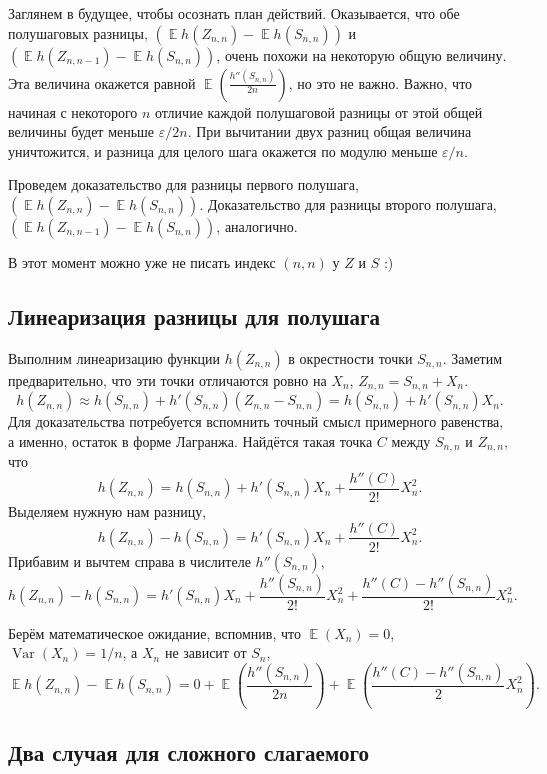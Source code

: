 \documentclass[
  letterpaper,
  DIV=11,
  numbers=noendperiod]{scrartcl}
\DeclareMathOperator{\E}{\mathbb{E}}
\DeclareMathOperator{\Var}{Var}
\begin{document}
Заглянем в будущее, чтобы осознать план действий. Оказывается, что обе
полушаговых разницы, \(\left(\E h(Z_{n,n}) - \E h(S_{n,n}) \right)\) и
\(\left(\E h(Z_{n,n-1}) - \E h(S_{n,n}) \right)\), очень похожи на
некоторую общую величину. Эта величина окажется равной
\(\E\left(\frac{h''(S_{n,n})}{2n}\right)\), но это не важно. Важно, что
начиная с некоторого \(n\) отличие каждой полушаговой разницы от этой
общей величины будет меньше \(\varepsilon/2n\). При вычитании двух
разниц общая величина уничтожится, и разница для целого шага окажется по
модулю меньше \(\varepsilon/n\).

Проведем доказательство для разницы первого полушага,
\(\left(\E h(Z_{n,n}) - \E h(S_{n,n}) \right)\). Доказательство для
разницы второго полушага,
\(\left(\E h(Z_{n,n-1}) - \E h(S_{n,n}) \right)\), аналогично.

В этот момент можно уже не писать индекс \((n,n)\) у \(Z\) и \(S\) :)

\subsection{Линеаризация разницы для
полушага}\label{ux43bux438ux43dux435ux430ux440ux438ux437ux430ux446ux438ux44f-ux440ux430ux437ux43dux438ux446ux44b-ux434ux43bux44f-ux43fux43eux43bux443ux448ux430ux433ux430}

Выполним линеаризацию функции \(h(Z_{n,n})\) в окрестности точки
\(S_{n,n}\). Заметим предварительно, что эти точки отличаются ровно на
\(X_n\), \(Z_{n,n} = S_{n,n} + X_n\). \[
h(Z_{n,n}) \approx h(S_{n,n}) + h'(S_{n,n})(Z_{n,n} - S_{n,n}) = h(S_{n,n}) + h'(S_{n,n}) X_n.
\] Для доказательства потребуется вспомнить точный смысл примерного
равенства, а именно, остаток в форме Лагранжа. Найдётся такая точка
\(C\) между \(S_{n,n}\) и \(Z_{n,n}\), что \[
h(Z_{n,n}) = h(S_{n,n}) + h'(S_{n,n})X_n + \frac{h''(C)}{2!}X_n^2.
\] Выделяем нужную нам разницу, \[
h(Z_{n,n}) - h(S_{n,n}) = h'(S_{n,n})X_n + \frac{h''(C)}{2!}X_n^2.
\] Прибавим и вычтем справа в числителе \(h''(S_{n,n})\), \[
h(Z_{n,n}) - h(S_{n,n}) = h'(S_{n,n})X_n + \frac{h''(S_{n,n})}{2!}X_n^2 + \frac{h''(C) - h''(S_{n,n})}{2!}X_n^2.
\]

Берём математическое ожидание, вспомнив, что \(\E(X_n) =0\),
\(\Var(X_n)= 1/n\), а \(X_n\) не зависит от \(S_n\), \[
\E h(Z_{n,n}) - \E h(S_{n,n}) = 0 + \E\left(\frac{h''(S_{n,n})}{2n}\right) + \E\left(\frac{h''(C) - h''(S_{n,n})}{2}X_n^2\right).
\]

\subsection{Два случая для сложного
слагаемого}\label{ux434ux432ux430-ux441ux43bux443ux447ux430ux44f-ux434ux43bux44f-ux441ux43bux43eux436ux43dux43eux433ux43e-ux441ux43bux430ux433ux430ux435ux43cux43eux433ux43e}
\end{document}
